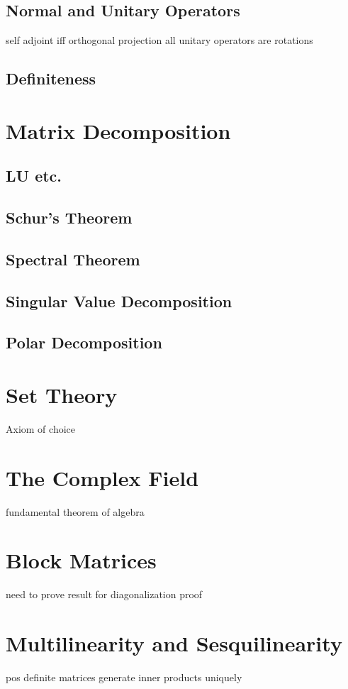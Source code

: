 \documentclass[oneside, 12pt]{book}
\theoremstyle{definition}
\begin{document}
\section{Normal and Unitary Operators}
self adjoint iff orthogonal projection
all unitary operators are rotations
\section{Definiteness}
\chapter{Matrix Decomposition}
\section{LU etc.}
\section{Schur's Theorem}
\section{Spectral Theorem}
\section{Singular Value Decomposition}
\section{Polar Decomposition}
\appendix
\chapter{Set Theory}
Axiom of choice
\chapter{The Complex Field}
fundamental theorem of algebra
\chapter{Block Matrices}
need to prove result for diagonalization proof
\chapter{Multilinearity and Sesquilinearity}
pos definite matrices generate inner products uniquely
\cleardoublepage
{}
{}
\printbibliography[title={References}]
\end{document}

